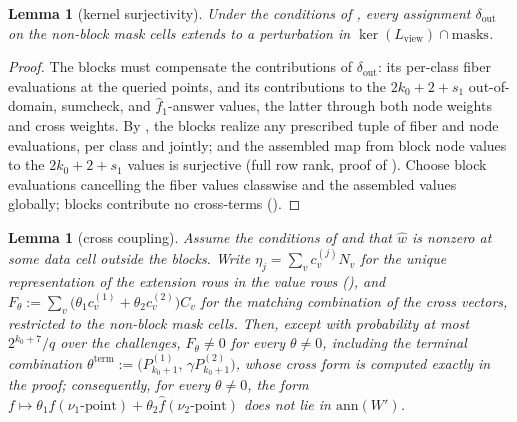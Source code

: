 \documentclass{article}
\newtheorem{lemma}[theorem]{Lemma}
\theoremstyle{definition}
\begin{document}
\begin{lemma}[kernel surjectivity]\label{lem:kersurj}
Under the conditions of , every assignment $\delta_{\mathrm{out}}$ on the non-block mask cells extends to a perturbation in $\ker(L_{\mathrm{view}}) \cap \mathrm{masks}$.
\end{lemma}

\begin{proof}
The blocks must compensate the contributions of $\delta_{\mathrm{out}}$: its per-class fiber evaluations at the queried points, and its contributions to the $2k_0 + 2 + s_1$ out-of-domain, sumcheck, and $\hat{f}_1$-answer values, the latter through both node weights and cross weights. By , the blocks realize any prescribed tuple of fiber and node evaluations, per class and jointly; and the assembled map from block node values to the $2k_0 + 2 + s_1$ values is surjective (full row rank, proof of ). Choose block evaluations cancelling the fiber values classwise and the assembled values globally; blocks contribute no cross-terms ().
\end{proof}

\begin{lemma}[cross coupling]\label{cond:cross2}
Assume the conditions of  and that $\hat{w}$ is nonzero at some data cell outside the blocks. Write $\eta_j = \sum_v c^{(j)}_v N_v$ for the unique representation of the extension rows in the value rows (), and $F_\theta := \sum_v \big(\theta_1 c^{(1)}_v + \theta_2 c^{(2)}_v\big) C_v$ for the matching combination of the cross vectors, restricted to the non-block mask cells. Then, except with probability at most $2^{k_0 + 7}/q$ over the challenges, $F_\theta \neq 0$ for \emph{every} $\theta \neq 0$, including the terminal combination $\theta^{\mathrm{term}} := \big(P^{(1)}_{k_0+1},\, \gamma P^{(2)}_{k_0+1}\big)$, whose cross form is computed exactly in the proof; consequently, for every $\theta \neq 0$, the form $f \mapsto \theta_1 \hat{f}(\nu_1\text{-point}) + \theta_2 \hat{f}(\nu_2\text{-point})$ does not lie in $\mathrm{ann}(W')$.
\end{lemma}
\end{document}
